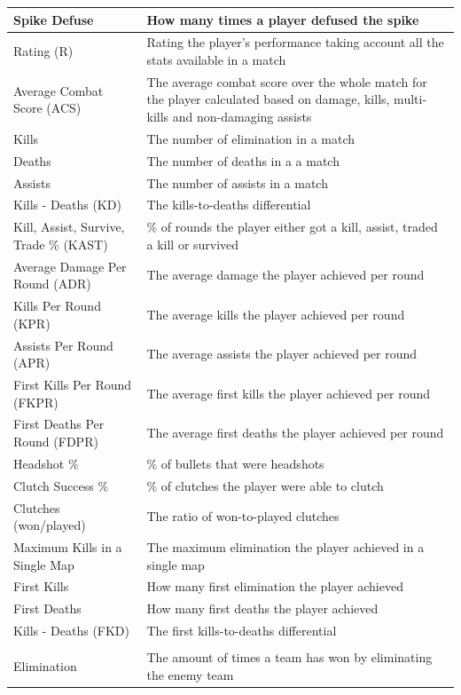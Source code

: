 \begin{longtable}{|>{\raggedright\arraybackslash}p{3cm}|p{12cm}|}
\hline
Spike Defuse & How many times a player defused the spike \\
\hline
Rating (R) & Rating the player's performance taking account all the stats available in a match \\
\hline
Average Combat Score (ACS) & The average combat score over the whole match for the player calculated based on damage, kills, multi-kills and non-damaging assists \\
\hline
Kills & The number of elimination in a match \\
\hline
Deaths & The number of deaths in a a match \\
\hline
Assists & The number of assists in a match \\
\hline
Kills - Deaths (KD) & The kills-to-deaths differential \\
\hline
Kill, Assist, Survive, Trade \% (KAST) & \% of rounds the player either got a kill, assist, traded a kill or survived \\
\hline
Average Damage Per Round (ADR) & The average damage the player achieved per round \\
\hline
Kills Per Round (KPR) & The average kills the player achieved per round \\
\hline
Assists Per Round (APR) & The average assists the player achieved per round \\
\hline
First Kills Per Round (FKPR) & The average first kills the player achieved per round \\
\hline
First Deaths Per Round (FDPR) & The average first deaths the player achieved per round \\
\hline
Headshot \% & \% of bullets that were headshots \\
\hline
Clutch Success \% & \% of clutches the player were able to clutch \\
\hline
Clutches (won/played) & The ratio of won-to-played clutches \\
\hline
Maximum Kills in a Single Map & The maximum elimination the player achieved in a single map \\
\hline
First Kills & How many first elimination the player achieved \\
\hline
First Deaths & How many first deaths the player achieved \\
\hline
Kills - Deaths (FKD) & The first kills-to-deaths differential \\
\hline
\multicolumn{2}{|c|}{\textbf{Round Win/Loss Conditions}} \\
\hline
Elimination & The amount of times a team has won by eliminating the enemy team \\

\end{longtable}
